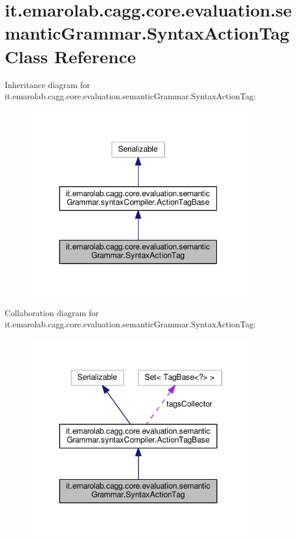 \hypertarget{classit_1_1emarolab_1_1cagg_1_1core_1_1evaluation_1_1semanticGrammar_1_1SyntaxActionTag}{\section{it.\-emarolab.\-cagg.\-core.\-evaluation.\-semantic\-Grammar.\-Syntax\-Action\-Tag Class Reference}
\label{classit_1_1emarolab_1_1cagg_1_1core_1_1evaluation_1_1semanticGrammar_1_1SyntaxActionTag}
}


Inheritance diagram for it.\-emarolab.\-cagg.\-core.\-evaluation.\-semantic\-Grammar.\-Syntax\-Action\-Tag\-:\nopagebreak
\begin{figure}[H]
\begin{center}
\leavevmode
\includegraphics[width=280pt]{classit_1_1emarolab_1_1cagg_1_1core_1_1evaluation_1_1semanticGrammar_1_1SyntaxActionTag__inherit__graph}
\end{center}
\end{figure}


Collaboration diagram for it.\-emarolab.\-cagg.\-core.\-evaluation.\-semantic\-Grammar.\-Syntax\-Action\-Tag\-:\nopagebreak
\begin{figure}[H]
\begin{center}
\leavevmode
\includegraphics[width=285pt]{classit_1_1emarolab_1_1cagg_1_1core_1_1evaluation_1_1semanticGrammar_1_1SyntaxActionTag__coll__graph}
\end{center}
\end{figure}
